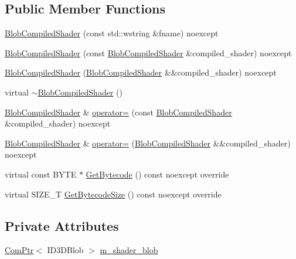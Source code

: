 \subsection*{Public Member Functions}
\begin{DoxyCompactItemize}
\item 
\mbox{\hyperlink{classmage_1_1rendering_1_1_blob_compiled_shader_a257647fb9e7999706704e7ba2782dc45}{Blob\+Compiled\+Shader}} (const std\+::wstring \&fname) noexcept
\item 
\mbox{\hyperlink{classmage_1_1rendering_1_1_blob_compiled_shader_a7b63a87261abf6059c957af4061af201}{Blob\+Compiled\+Shader}} (const \mbox{\hyperlink{classmage_1_1rendering_1_1_blob_compiled_shader}{Blob\+Compiled\+Shader}} \&compiled\+\_\+shader) noexcept
\item 
\mbox{\hyperlink{classmage_1_1rendering_1_1_blob_compiled_shader_afa58cbbad81febc6c2470f6f1b0de2ce}{Blob\+Compiled\+Shader}} (\mbox{\hyperlink{classmage_1_1rendering_1_1_blob_compiled_shader}{Blob\+Compiled\+Shader}} \&\&compiled\+\_\+shader) noexcept
\item 
virtual \mbox{\hyperlink{classmage_1_1rendering_1_1_blob_compiled_shader_ac983a2506dfe81e8e8ceb2b9ffa420d6}{$\sim$\+Blob\+Compiled\+Shader}} ()
\item 
\mbox{\hyperlink{classmage_1_1rendering_1_1_blob_compiled_shader}{Blob\+Compiled\+Shader}} \& \mbox{\hyperlink{classmage_1_1rendering_1_1_blob_compiled_shader_a07f7bf56354508ad499133b821e2fdc5}{operator=}} (const \mbox{\hyperlink{classmage_1_1rendering_1_1_blob_compiled_shader}{Blob\+Compiled\+Shader}} \&compiled\+\_\+shader) noexcept
\item 
\mbox{\hyperlink{classmage_1_1rendering_1_1_blob_compiled_shader}{Blob\+Compiled\+Shader}} \& \mbox{\hyperlink{classmage_1_1rendering_1_1_blob_compiled_shader_a14954683e57897937b0e0178b5a726a4}{operator=}} (\mbox{\hyperlink{classmage_1_1rendering_1_1_blob_compiled_shader}{Blob\+Compiled\+Shader}} \&\&compiled\+\_\+shader) noexcept
\item 
virtual const B\+Y\+TE $\ast$ \mbox{\hyperlink{classmage_1_1rendering_1_1_blob_compiled_shader_a4d7f3d2d9864cb12939386ff031bd783}{Get\+Bytecode}} () const noexcept override
\item 
virtual S\+I\+Z\+E\+\_\+T \mbox{\hyperlink{classmage_1_1rendering_1_1_blob_compiled_shader_ac3c3edb09ba96367f8c5d6741ec03041}{Get\+Bytecode\+Size}} () const noexcept override
\end{DoxyCompactItemize}
\subsection*{Private Attributes}
\begin{DoxyCompactItemize}
\item 
\mbox{\hyperlink{namespacemage_ae74f374780900893caa5555d1031fd79}{Com\+Ptr}}$<$ I\+D3\+D\+Blob $>$ \mbox{\hyperlink{classmage_1_1rendering_1_1_blob_compiled_shader_ad28d77dc5fd97d127c2e2dc875384449}{m\+\_\+shader\+\_\+blob}}
\end{DoxyCompactItemize}
